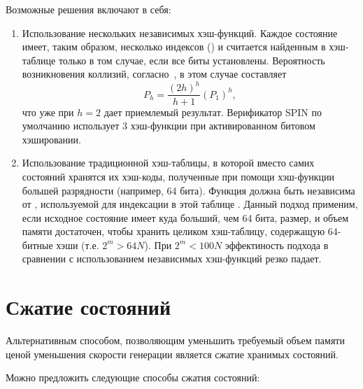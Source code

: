 Возможные решения включают в себя:

\begin{enumerate}
\item Использование нескольких независимых хэш-функций. Каждое
  состояние имеет, таким образом, несколько индексов () и считается
  найденным в хэш-таблице только в том случае, если все биты
   установлены. Вероятность возникновения
  коллизий, согласно~\cite{BitHash1}, в этом случае составляет
  \begin{equation}
    \label{eq:bithash-multi-coll}
    P_h = \frac{(2 h)^h}{h+1} (P_1)^h,
  \end{equation}
  что уже при $h = 2$ дает приемлемый результат. Верификатор SPIN по
  умолчанию использует 3 хэш-функции при активированном битовом
  хэшировании.

\item Использование традиционной хэш-таблицы, в которой вместо самих
  состояний хранятся их хэш-коды, полученные при помощи хэш-функции
   большей разрядности (например, 64 бита). Функция 
  должна быть независима от , используемой для индексации в этой
  таблице \cite{BitHash1}. Данный подход применим, если исходное
  состояние имеет куда больший, чем 64 бита, размер, и объем памяти
  достаточен, чтобы хранить целиком хэш-таблицу, содержащую 64-битные
  хэши (т.е. $2^m > 64 N$). При $2^m < 100 N$ эффектиность подхода в
  сравнении с использованием независимых хэш-функций резко падает.
\end{enumerate}

\section{Сжатие состояний}
\label{sec:state-compression}


Альтернативным способом, позволяющим уменьшить требуемый объем памяти ценой уменьшения
скорости генерации является сжатие хранимых состояний.

Можно предложить следующие способы сжатия состояний:

